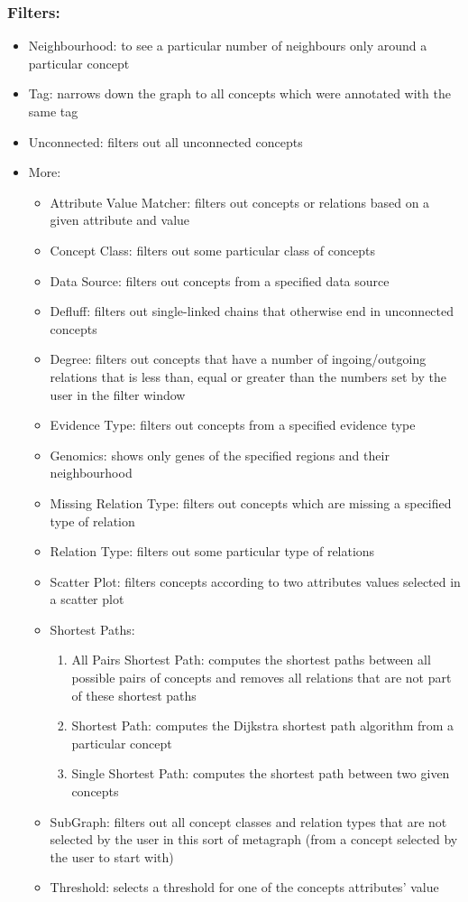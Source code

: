 \subsubsection{Filters:}
   \begin{itemize}
   \item Neighbourhood: to see a particular number of neighbours only around a particular concept 
   \item Tag: narrows down the graph to all concepts which were annotated with the same tag
   \item Unconnected: filters out all unconnected concepts
   \item More:
	\begin{itemize}
	\item Attribute Value Matcher: filters out concepts or relations based on a given attribute and value
	\item Concept Class: filters out some particular class of concepts
	\item Data Source: filters out concepts from a specified data source
	\item Defluff: filters out single-linked chains that otherwise end in unconnected concepts
	\item Degree: filters out concepts that have a number of ingoing/outgoing relations that is less than, equal or greater than the numbers set by the user in the filter window
	\item Evidence Type: filters out concepts from a specified evidence type
	\item Genomics: shows only genes of the specified regions and their neighbourhood
	\item Missing Relation Type: filters out concepts which are missing a specified type of relation
	\item Relation Type: filters out some particular type of relations
	\item Scatter Plot: filters concepts according to two attributes values selected in a scatter plot 
	\item Shortest Paths:
	  \begin{enumerate}
	  \item All Pairs Shortest Path:
	  computes the shortest paths between all possible pairs of concepts and removes all relations that are not part of these shortest paths
	  \item Shortest Path:
	  computes the Dijkstra shortest path algorithm from a particular concept 
	  \item Single Shortest Path:
	  computes the shortest path between two given concepts
	  \end{enumerate}
	\item SubGraph:
	filters out all concept classes and relation types that are not selected by the user in this sort of metagraph (from a concept selected by the user to start with)
	\item Threshold:
	selects a threshold for one of the concepts attributes' value
	\end{itemize}
   \end{itemize}


